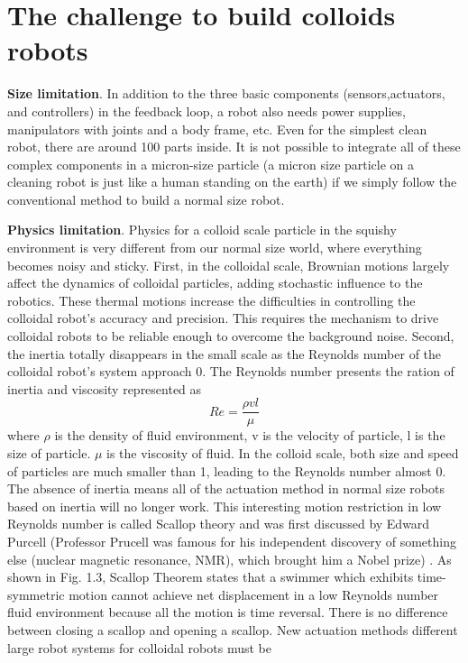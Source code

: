 \section{The challenge to  build colloids robots}

\textbf{Size limitation}. In addition to the three basic components (sensors,actuators, and controllers) in the feedback loop, a robot also needs power supplies, manipulators with joints and a body frame, etc. Even for the simplest clean robot, there are around 100 parts inside. It is not possible to integrate all of these complex components in a micron-size particle (a micron size particle on a cleaning robot is just like a human standing on the earth)  if we simply follow the conventional method to build a normal size robot. 

\textbf{Physics limitation}. Physics for a colloid scale particle in the squishy  environment is very different from our normal size world, where everything becomes noisy and sticky. First, in the colloidal scale, Brownian motions largely affect the dynamics of colloidal particles, adding stochastic influence to the robotics. These thermal motions increase the difficulties in controlling the colloidal robot's accuracy and precision. This requires the mechanism to drive colloidal robots to be reliable enough to overcome the background noise. Second, the inertia totally disappears in the small scale as the Reynolds number of the colloidal robot's system approach 0.  The Reynolds number presents the ration of inertia and viscosity represented as
\begin{equation}
    Re=\frac{\rho v l}{\mu}
\end{equation}
where $\rho $ is the density of fluid environment, v is the velocity of particle, l is the size of particle. $\mu$ is the  viscosity of fluid. In the colloid scale, both size and speed of particles are much smaller than 1, leading to the Reynolds number almost 0. The absence of inertia means all of the actuation method in normal size robots based on inertia will no longer work. This interesting  motion restriction in low Reynolds number is called Scallop
theory and was first discussed by Edward Purcell (Professor Prucell was famous for his independent discovery of something else (nuclear magnetic resonance, NMR), which brought him a Nobel prize) \autocite{purcell1977life}. As shown in Fig. 1.3, Scallop Theorem states that a swimmer which exhibits time-symmetric motion cannot achieve net displacement in a low Reynolds number fluid environment because all the motion is time reversal. There is no difference between closing a scallop and opening a scallop. New actuation methods different large robot systems for colloidal robots must be 

